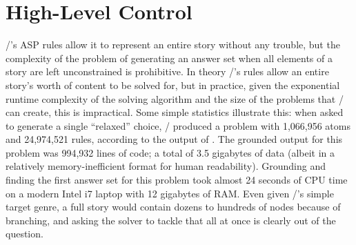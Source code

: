 \section{High-Level Control}
\label{sec:dunyazad-control}

\dunyazad/'s ASP rules allow it to represent an entire story without any trouble, but the complexity of the problem of generating an answer set when all elements of a story are left unconstrained is prohibitive.
%
In theory \dunyazad/'s rules allow an entire story's worth of content to be solved for, but in practice, given the exponential runtime complexity of the solving algorithm and the size of the problems that \dunyazad/ can create, this is impractical.
%
Some simple statistics illustrate this: when asked to generate a single ``relaxed'' choice, \dunyazad/ produced a problem with 1,066,956 atoms and 24,974,521 rules, according to the output of .
%
The grounded output for this problem was 994,932 lines of code; a total of 3.5 gigabytes of data (albeit in a relatively memory-inefficient format for human readability).
%
Grounding and finding the first answer set for this problem took almost 24 seconds of CPU time on a modern Intel i7 laptop with 12 gigabytes of RAM.
%
Even given \dunyazad/'s simple target genre, a full story would contain dozens to hundreds of nodes because of branching, and asking the solver to tackle that all at once is clearly out of the question.


